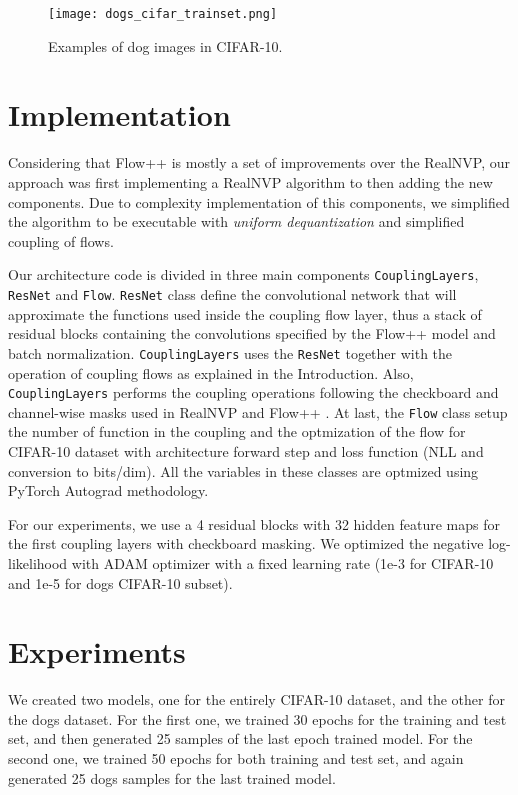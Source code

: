 \documentclass{article}
\begin{document}
\begin{figure}
  \centering
  \texttt{[image: dogs\_cifar\_trainset.png]}
  \caption{Examples of dog images in CIFAR-10.}
  \label{fig:dogDatasetamples}
\end{figure}

\section{Implementation}

Considering that Flow++ is mostly a set of improvements over the RealNVP, our approach was first implementing a RealNVP algorithm to then adding the new components. Due to complexity implementation of this components, we simplified the algorithm to be executable with \emph{uniform dequantization} and simplified coupling of flows.

Our architecture code is divided in three main components \texttt{CouplingLayers}, \texttt{ResNet} and \texttt{Flow}. \texttt{ResNet} class define the convolutional network that will approximate the functions used inside the coupling flow layer, thus a stack of residual blocks containing the convolutions specified by the Flow++ model and batch normalization. \texttt{CouplingLayers} uses the \texttt{ResNet} together with the operation of coupling flows as explained in the Introduction. Also, \texttt{CouplingLayers} performs the coupling operations following the checkboard and channel-wise masks used in RealNVP \cite{dinh2016density} and Flow++ \cite{ho2019flow++}. At last, the \texttt{Flow} class setup the number of function in the coupling and the optmization of the flow for CIFAR-10 dataset with architecture forward step and loss function (NLL and conversion to bits/dim). All the variables in these classes are optmized using PyTorch Autograd methodology. 

For our experiments, we use a 4 residual blocks with 32 hidden feature maps for the first coupling layers with checkboard masking. We optimized the negative log-likelihood with ADAM optimizer with a fixed learning rate (1e-3 for CIFAR-10 and 1e-5 for dogs CIFAR-10 subset).

\section{Experiments}

We created two models, one for the entirely CIFAR-10 dataset, and the other for the dogs dataset. For the first one, we trained 30 epochs for the training and test set, and then generated 25 samples of the last epoch trained model. For the second one, we trained 50 epochs for both training and test set, and again generated 25 dogs samples for the last trained model.
\end{document}
